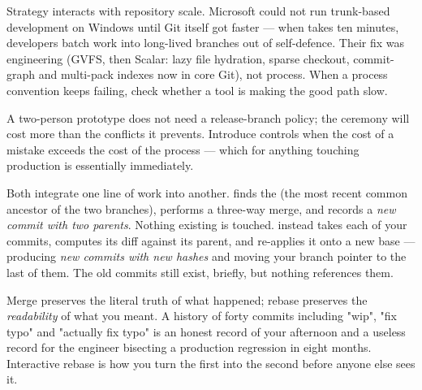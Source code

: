 \begin{scalenote}
Strategy interacts with repository scale. Microsoft could not run trunk-based development on Windows until Git itself got faster --- when  takes ten minutes, developers batch work into long-lived branches out of self-defence. Their fix was engineering (GVFS, then Scalar: lazy file hydration, sparse checkout, commit-graph and multi-pack indexes now in core Git), not process. When a process convention keeps failing, check whether a tool is making the good path slow.
\end{scalenote}

 A two-person prototype does not need a release-branch policy; the ceremony will cost more than the conflicts it prevents. Introduce controls when the cost of a mistake exceeds the cost of the process --- which for anything touching production is essentially immediately.


 Both integrate one line of work into another.  finds the  (the most recent common ancestor of the two branches), performs a three-way merge, and records a \emph{new commit with two parents}. Nothing existing is touched.  instead takes each of your commits, computes its diff against its parent, and re-applies it onto a new base --- producing \emph{new commits with new hashes} and moving your branch pointer to the last of them. The old commits still exist, briefly, but nothing references them.

 Merge preserves the literal truth of what happened; rebase preserves the \emph{readability} of what you meant. A history of forty commits including "wip", "fix typo" and "actually fix typo" is an honest record of your afternoon and a useless record for the engineer bisecting a production regression in eight months. Interactive rebase is how you turn the first into the second before anyone else sees it.

